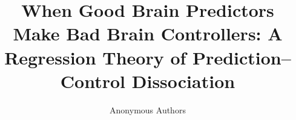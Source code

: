 \documentclass{article}
\title{When Good Brain Predictors Make Bad Brain Controllers: A Regression Theory of Prediction–Control Dissociation}
\author{Anonymous Authors}
\theoremstyle{plain}
\theoremstyle{definition}
\theoremstyle{remark}
\begin{document}
\maketitle

\begin{abstract}

\end{abstract}
\end{document}
